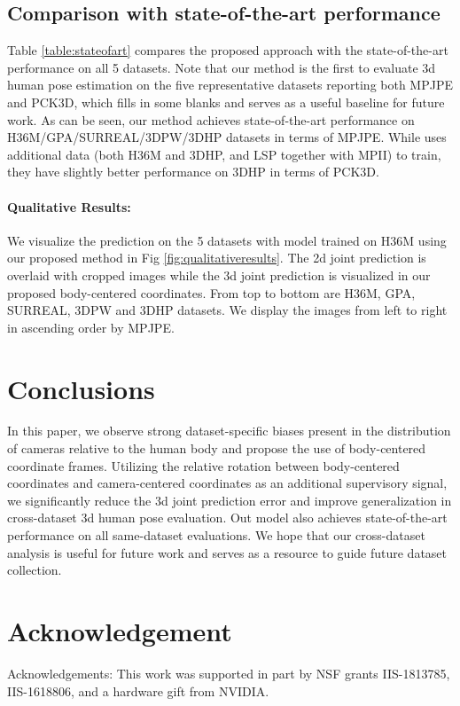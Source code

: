 \documentclass[runningheads]{llncs}
\begin{document}
\subsection{Comparison with state-of-the-art performance} 

Table \ref{table:stateofart} compares the proposed approach with the state-of-the-art
performance on all 5 datasets. Note that our method is the first to evaluate 3d
human pose estimation on the five representative datasets reporting both MPJPE
and PCK3D, which fills in some blanks and serves as a useful baseline for future 
work. As can be seen, our method achieves state-of-the-art performance on
H36M/GPA/SURREAL/3DPW/3DHP datasets in terms of MPJPE. While
\cite{HMMR} uses additional data (both H36M and 3DHP, and LSP
together with MPII) to train, they have slightly better performance on 3DHP in
terms of PCK3D. 


\paragraph{Qualitative Results:} We visualize the prediction on the 5 datasets
with model trained on H36M using our proposed method in Fig
\ref{fig:qualitativeresults}. The 2d joint prediction is overlaid with cropped
images while the 3d joint prediction is visualized in our proposed
body-centered coordinates. From top to bottom are H36M, GPA, SURREAL, 3DPW and
3DHP datasets. We display the images from left to right in ascending order by
MPJPE.

\section{Conclusions}
\label{sec:conclusion}
In this paper, we observe strong dataset-specific biases present in the
distribution of cameras relative to the human body and propose the use of
body-centered coordinate frames. Utilizing the relative rotation between
body-centered coordinates and camera-centered coordinates as an additional
supervisory signal, we significantly reduce the 3d joint prediction error and improve generalization in cross-dataset 3d human pose evaluation. Out 
model also achieves state-of-the-art performance on all same-dataset evaluations. We hope that our cross-dataset analysis is useful for future work and serves as a resource to guide future dataset collection.

\section{Acknowledgement}
Acknowledgements:  This work was supported in part by NSF grants IIS-1813785, IIS-1618806, 
and a hardware gift from NVIDIA.
\end{document}

